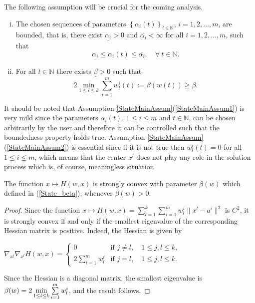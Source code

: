 The following assumption will be crucial for the coming analysis.
\begin{assumption}\label{StateMainAssum}
\begin{enumerate}[(i)] 
	\item The chosen sequences of parameters $\left\lbrace \alpha_i(t) \right\rbrace_{t \in \mathbb{N}}$, $i=1,2, \ldots, m$, are bounded, that is, there exist $\underline{\alpha_i} > 0$ and $\overline{\alpha_i} < \infty$ for all $i=1,2, \ldots, m$, such that
		\begin{equation}
			\underline{\alpha_i} \leq \alpha_i(t) \leq \overline{\alpha_i}, \quad \forall \: t \in \mathbb{N}.
		\end{equation}		 \label{StateMainAssum1}
	\item For all $t \in \mathbb{N}$ there exists $\underline{\beta} > 0$ such that
		\begin{equation}
			2 \min\limits_{1 \leq l \leq k} \sum\limits_{i=1}^{m} w^i_l(t) := \beta(w(t)) \geq \underline{\beta}. \label{State_beta}
		\end{equation}		 \label{StateMainAssum2}
\end{enumerate}
\end{assumption}
It should be noted that Assumption \ref{StateMainAssum}(\ref{StateMainAssum1}) is very mild since the parameters $\alpha_i(t)$, $1 \leq i \leq m$ and $t \in \mathbb{N}$, can be chosen arbitrarily by the user and therefore it can be controlled such that the boundedness property holds true. Assumption \ref{StateMainAssum}(\ref{StateMainAssum2}) is essential since if it is not true then $w^i_l(t)=0$ for all $1 \leq i \leq m$, which means that the center $x^l$ does not play any role in the solution process which is, of course, meaningless situation.

\begin{lemma} \label{StateEq14}
The function $x \mapsto H(w,x)$ is strongly convex with parameter $\beta(w)$ which defined in (\ref{State_beta}), whenever $\beta(w) > 0$.
\end{lemma}

\begin{proof}
Since the function $x \mapsto H(w,x) = 
\sum\limits_{l=1}^{k} \sum\limits_{i=1}^{m} w^i_l \|x^l - a^i\|^2$ is $C^2$, it is strongly convex if and only if the smallest eigenvalue of the corresponding Hessian matrix is positive. Indeed, the Hessian is given by

\begin{center}
$\nabla_{x^j} \nabla_{x^l} H(w,x) = 
\begin{cases} 0 &\mbox{if } j \neq l, \quad 1 \leq j,l \leq k ,
\\ 2\sum\limits_{i=1}^{m} w^i_l &\mbox{if } j = l, \quad 1 \leq j,l \leq k. \end{cases} $
\end{center}

Since the Hessian is a diagonal matrix, the smallest eigenvalue is $\beta(w) = \\ 2\min\limits_{1 \leq l \leq k} \sum\limits_{i=1}^{m} w^i_l$, and the result follows.
\end{proof}

